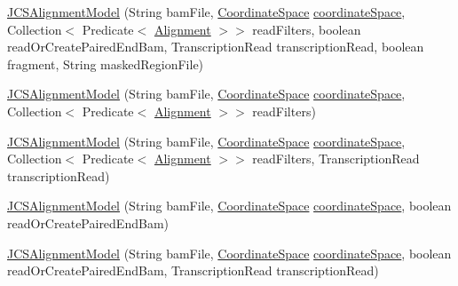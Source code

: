 \begin{DoxyCompactItemize}
\item 
\hyperlink{classumms_1_1core_1_1model_1_1_j_c_s_alignment_model_aa4dc34aa180164bacaba93edc59d21ab}{J\+C\+S\+Alignment\+Model} (String bam\+File, \hyperlink{interfaceumms_1_1core_1_1coordinatesystem_1_1_coordinate_space}{Coordinate\+Space} \hyperlink{classumms_1_1core_1_1model_1_1_j_c_s_alignment_model_aa04751a0c366de794593489168749245}{coordinate\+Space}, Collection$<$ Predicate$<$ \hyperlink{interfaceumms_1_1core_1_1alignment_1_1_alignment}{Alignment} $>$$>$ read\+Filters, boolean read\+Or\+Create\+Paired\+End\+Bam, Transcription\+Read transcription\+Read, boolean fragment, String masked\+Region\+File)
\item 
\hyperlink{classumms_1_1core_1_1model_1_1_j_c_s_alignment_model_a741215ab27a69a4bd736cb039603e917}{J\+C\+S\+Alignment\+Model} (String bam\+File, \hyperlink{interfaceumms_1_1core_1_1coordinatesystem_1_1_coordinate_space}{Coordinate\+Space} \hyperlink{classumms_1_1core_1_1model_1_1_j_c_s_alignment_model_aa04751a0c366de794593489168749245}{coordinate\+Space}, Collection$<$ Predicate$<$ \hyperlink{interfaceumms_1_1core_1_1alignment_1_1_alignment}{Alignment} $>$$>$ read\+Filters)
\item 
\hyperlink{classumms_1_1core_1_1model_1_1_j_c_s_alignment_model_a50cb20d42d4d51f5625ec32c7f8d9cbe}{J\+C\+S\+Alignment\+Model} (String bam\+File, \hyperlink{interfaceumms_1_1core_1_1coordinatesystem_1_1_coordinate_space}{Coordinate\+Space} \hyperlink{classumms_1_1core_1_1model_1_1_j_c_s_alignment_model_aa04751a0c366de794593489168749245}{coordinate\+Space}, Collection$<$ Predicate$<$ \hyperlink{interfaceumms_1_1core_1_1alignment_1_1_alignment}{Alignment} $>$$>$ read\+Filters, Transcription\+Read transcription\+Read)
\item 
\hyperlink{classumms_1_1core_1_1model_1_1_j_c_s_alignment_model_a0d686d3511221c1bd0d25c877851bc9e}{J\+C\+S\+Alignment\+Model} (String bam\+File, \hyperlink{interfaceumms_1_1core_1_1coordinatesystem_1_1_coordinate_space}{Coordinate\+Space} \hyperlink{classumms_1_1core_1_1model_1_1_j_c_s_alignment_model_aa04751a0c366de794593489168749245}{coordinate\+Space}, boolean read\+Or\+Create\+Paired\+End\+Bam)
\item 
\hyperlink{classumms_1_1core_1_1model_1_1_j_c_s_alignment_model_a9150a136cbc88ddba57213b40e3ac742}{J\+C\+S\+Alignment\+Model} (String bam\+File, \hyperlink{interfaceumms_1_1core_1_1coordinatesystem_1_1_coordinate_space}{Coordinate\+Space} \hyperlink{classumms_1_1core_1_1model_1_1_j_c_s_alignment_model_aa04751a0c366de794593489168749245}{coordinate\+Space}, boolean read\+Or\+Create\+Paired\+End\+Bam, Transcription\+Read transcription\+Read)
$$
\end{DoxyCompactItemize}
